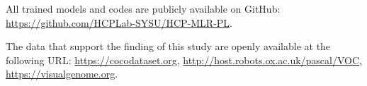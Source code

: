  \quad All trained models and codes are publicly available on GitHub: \url{https://github.com/HCPLab-SYSU/HCP-MLR-PL}.

 \quad The data that support the finding of this study are openly available at the following URL: \url{https://cocodataset.org}, \url{http://host.robots.ox.ac.uk/pascal/VOC}, \url{https://visualgenome.org}.



       


